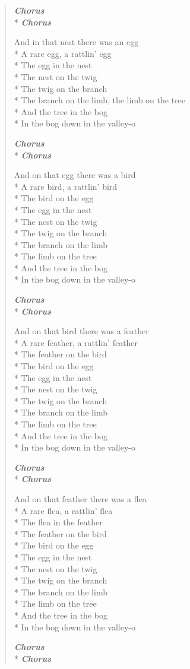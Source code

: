 \documentclass[9pt,twoside]{extarticle}
\makeatletter
\newenvironment{xverse}{
	\begin{verse}
	\fontsize{8.5}{10.5}\selectfont
}{
	\end{verse}
}
\newcommand{\chorus@mark}[1][1]{%
\textbf{\emph{Chorus \ifthenelse{\equal{#1}{1}}{}{$\times$ #1}}}%
}
\newcommand{\chorusmark}[1][1]{%
\ifvmode%
\vspace{-0.5\stanzaskip}%
\chorus@mark[#1]%
\vspace{-0.5\stanzaskip}%
\else \\*%
\chorus@mark[#1]%
\fi%
}
\makeatother
\begin{document}
\begin{xverse}
\chorusmark

And in that nest there was an egg \\*
A rare egg, a rattlin’ egg \\*
The egg in the nest \\*
The nest on the twig \\*
The twig on the branch \\*
The branch on the limb, the limb on the tree \\*
And the tree in the bog \\*
In the bog down in the valley-o

\chorusmark

And on that egg there was a bird \\*
A rare bird, a rattlin’ bird \\*
The bird on the egg \\*
The egg in the nest \\*
The nest on the twig \\*
The twig on the branch \\*
The branch on the limb \\*
The limb on the tree \\*
And the tree in the bog \\*
In the bog down in the valley-o

\chorusmark

And on that bird there was a feather \\*
A rare feather, a rattlin’ feather \\*
The feather on the bird \\*
The bird on the egg \\*
The egg in the nest \\*
The nest on the twig \\*
The twig on the branch \\*
The branch on the limb \\*
The limb on the tree \\*
And the tree in the bog \\*
In the bog down in the valley-o

\chorusmark

And on that feather there was a flea \\*
A rare flea, a rattlin’ flea \\*
The flea in the feather \\*
The feather on the bird \\*
The bird on the egg \\*
The egg in the nest \\*
The nest on the twig \\*
The twig on the branch \\*
The branch on the limb \\*
The limb on the tree \\*
And the tree in the bog \\*
In the bog down in the valley-o

\chorusmark[4]
\end{xverse}
\end{document}

